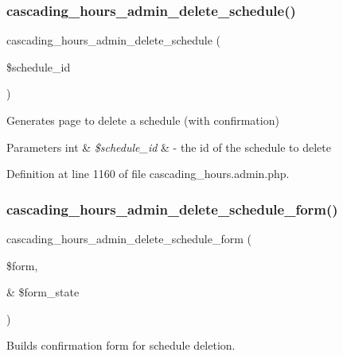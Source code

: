 \subsubsection{\texorpdfstring{cascading\+\_\+hours\+\_\+admin\+\_\+delete\+\_\+schedule()}{cascading\_hours\_admin\_delete\_schedule()}}
{\footnotesize\ttfamily cascading\+\_\+hours\+\_\+admin\+\_\+delete\+\_\+schedule (\begin{DoxyParamCaption}\item[{}]{\$schedule\+\_\+id }\end{DoxyParamCaption})}



Generates page to delete a schedule (with confirmation) 


\begin{DoxyParams}[1]{Parameters}
int & {\em \$schedule\+\_\+id} & -\/ the id of the schedule to delete \\
\hline
\end{DoxyParams}


Definition at line 1160 of file cascading\+\_\+hours.\+admin.\+php.

\mbox{\label{cascading__hours_8admin_8php_a883a2af8b6434faccc0ff58acc372d5a_a883a2af8b6434faccc0ff58acc372d5a}} 
\subsubsection{\texorpdfstring{cascading\+\_\+hours\+\_\+admin\+\_\+delete\+\_\+schedule\+\_\+form()}{cascading\_hours\_admin\_delete\_schedule\_form()}}
{\footnotesize\ttfamily cascading\+\_\+hours\+\_\+admin\+\_\+delete\+\_\+schedule\+\_\+form (\begin{DoxyParamCaption}\item[{}]{\$form,  }\item[{\&}]{\$form\+\_\+state }\end{DoxyParamCaption})}



Builds confirmation form for schedule deletion. 


